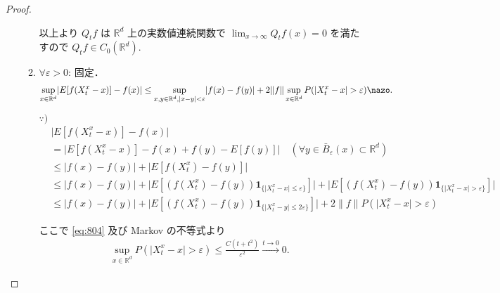 \documentclass{jsarticle}
\begin{document}
\begin{proof}
\begin{enumerate}[label=(\arabic*)]
\begin{enumerate}[label=(\roman*)]
            以上より $Q_{t}f$ は $\mathbb{R}^d$ 上の実数値連続関数で $\lim_{x\to\infty}Q_{t}f(x)=0$ を満たすので $Q_{t}f\in C_{0}(\mathbb{R}^d).$
                
            \item
            $\forall \varepsilon>0$: 固定．
            \begin{align}
                \sup_{x\in\mathbb{R}^d}\lvert E[f(X_{t}^{x}-x)]-f(x)\rvert
                \le \sup_{x, y\in\mathbb{R}^d, \lvert x-y\rvert<\varepsilon}\lvert f(x)-f(y)\rvert
                + 2\lVert f\rVert\sup_{x\in\mathbb{R}^d}P(\lvert X_{t}^{x}-x\rvert>\varepsilon)\nazo.
            \end{align}
            
            \begin{screen}
                $\because)$
                \begin{align}
                    &\lvert E[f(X_{t}^{x}-x)]-f(x)\rvert \\
                    &= \lvert E[f(X_{t}^{x}-x)]-f(x)+f(y)-E[f(y)]\rvert
                    \quad(\forall y\in \bar{B}_{\varepsilon}(x)\subset \mathbb{R}^d) \\
                    &\le \lvert f(x)-f(y)\rvert
                    + \lvert E[f(X_{t}^{x})-f(y)]\rvert \\
                    &\le \lvert f(x)-f(y)\rvert
                    + \lvert E[(f(X_{t}^{x})-f(y))\bm{1}_{\{\lvert X_t^x-x\rvert\le\varepsilon\}}]\rvert
                    + \lvert E[(f(X_{t}^{x})-f(y))\bm{1}_{\{\lvert X_t^x-x\rvert>\varepsilon\}}]\rvert \\
                    &\le \lvert f(x)-f(y)\rvert
                    + \lvert E[(f(X_{t}^{x})-f(y))\bm{1}_{\{\lvert X_t^x-y\rvert\le2\varepsilon\}}]\rvert
                    + 2\lVert f\rVert P(\lvert X_t^x-x\rvert>\varepsilon)
                \end{align}
            \end{screen}

            ここで \eqref{eq:804} 及び Markov の不等式より
            \begin{align}
                \sup_{x\in\mathbb{R}^d}P(\lvert X_{t}^{x}-x\rvert>\varepsilon)
                \le \frac{C(t+t^2)}{\varepsilon^2}\xrightarrow{t\to0}0.
            \end{align}


\end{enumerate}
\end{enumerate}
\end{proof}
\end{document}
